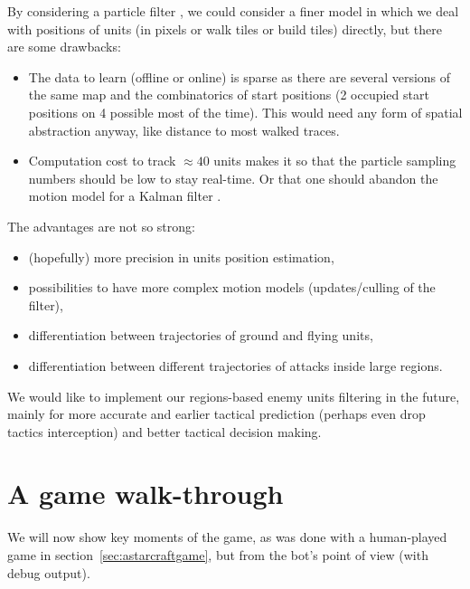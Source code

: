 By considering a particle filter \citep{Thrun02d}, we could consider a finer model in which we deal with positions of units (in pixels or walk tiles or build tiles) directly, but there are some drawbacks:
\begin{itemize}
    \item The data to learn (offline or online) is sparse as there are several versions of the same map and the combinatorics of start positions (2 occupied start positions on 4 possible most of the time). This would need any form of spatial abstraction anyway, like distance to most walked traces.
    \item Computation cost to track $\approx 40$ units makes it so that the particle sampling numbers should be low to stay real-time. Or that one should abandon the motion model for a Kalman filter \citep{Kalman1960}. 
\end{itemize}
The advantages are not so strong: 
\begin{itemize}
    \item (hopefully) more precision in units position estimation,
    \item possibilities to have more complex motion models (updates/culling of the filter),
    \item differentiation between trajectories of ground and flying units,
    \item differentiation between different trajectories of attacks inside large regions.
\end{itemize}
We would like to implement our regions-based enemy units filtering in the future, mainly for more accurate and earlier tactical prediction (perhaps even drop tactics interception) and better tactical decision making.


\section{A game walk-through}

We will now show key moments of the game, as was done with a human-played game in section~\ref{sec:astarcraftgame}, but from the bot's point of view (with debug output).

